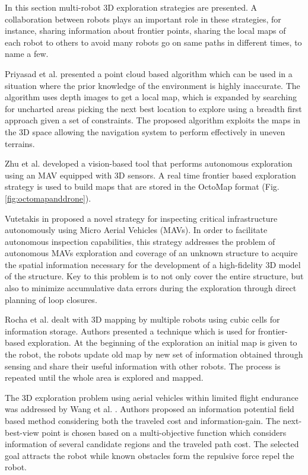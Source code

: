 In this section multi-robot 3D exploration strategies are presented. A collaboration between robots plays an important role in these strategies, for instance, sharing information about frontier points, sharing the local maps of each
robot to others to avoid many robots go on same paths in different times, to name a few.

Priyasad et al. \cite{Priyasad2018} presented a point cloud based algorithm which can be used in a situation where the prior knowledge of the environment is highly inaccurate. The algorithm uses depth images to get a local map, which is expanded by searching for uncharted areas picking the next best
location to explore using a breadth first approach given a set of
constraints. The proposed algorithm exploits the maps in the 3D
space allowing the navigation system to perform effectively in uneven terrains. 

Zhu et al. \cite{Zhu2015} developed a vision-based tool that performs autonomous exploration using an MAV equipped with 3D sensors. A real time frontier based exploration strategy is used to build maps that are stored in the OctoMap format (Fig. \ref{fig:octomapanddrone}).

Vutetakis in \cite{Vutetakis2019} proposed a novel strategy for inspecting critical infrastructure autonomously using Micro Aerial Vehicles (MAVs). In order to facilitate autonomous inspection capabilities, this strategy addresses the problem of autonomous MAVs exploration and coverage of an unknown structure to acquire the spatial information necessary for the development of a high-fidelity 3D model of the structure. Key to this problem is to not only cover the entire structure, but also to minimize accumulative data errors during the exploration through direct planning of loop closures. 

Rocha et al. \cite{Rocha2005} dealt with 3D mapping by multiple robots using cubic cells for information storage. Authors presented a technique which is used for frontier-based exploration. At the beginning of the exploration an initial map is given to the robot, the robots update old map by new set of information obtained through sensing and share their useful information with other robots. The process is repeated until the whole area is explored and mapped.

The 3D exploration problem using aerial vehicles within limited flight endurance was addressed by Wang et al. \cite{Wang2019}. Authors proposed an information potential field based method considering both the traveled cost and information-gain. The next-best-view point is chosen based on a multi-objective function which considers information of several candidate regions and the traveled path cost. The selected goal
attracts the robot while known obstacles form the repulsive
force repel the robot.

